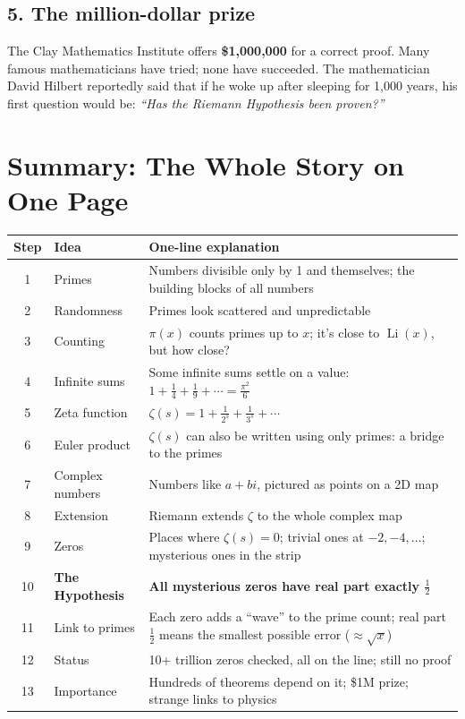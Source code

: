 \documentclass[11pt,a4paper]{article}
\newcommand{\Li}{\operatorname{Li}}
\begin{document}
\subsection*{5. The million-dollar prize}
The Clay Mathematics Institute offers \textbf{\$1{,}000{,}000} for a correct proof. Many famous mathematicians have tried; none have succeeded. The mathematician David Hilbert reportedly said that if he woke up after sleeping for 1,000 years, his first question would be: \emph{``Has the Riemann Hypothesis been proven?''}

\section{Summary: The Whole Story on One Page}

\begin{center}
\renewcommand{\arraystretch}{1.25}
\begin{tabularx}{\textwidth}{c l X}
\toprule
Step & Idea & One-line explanation \\
\midrule
1 & Primes & Numbers divisible only by 1 and themselves; the building blocks of all numbers \\
2 & Randomness & Primes look scattered and unpredictable \\
3 & Counting & $\pi(x)$ counts primes up to $x$; it's close to $\Li(x)$, but how close? \\
4 & Infinite sums & Some infinite sums settle on a value: $1 + \frac14 + \frac19 + \cdots = \frac{\pi^2}{6}$ \\
5 & Zeta function & $\zeta(s) = 1 + \frac1{2^s} + \frac1{3^s} + \cdots$ \\
6 & Euler product & $\zeta(s)$ can also be written using only primes: a bridge to the primes \\
7 & Complex numbers & Numbers like $a + bi$, pictured as points on a 2D map \\
8 & Extension & Riemann extends $\zeta$ to the whole complex map \\
9 & Zeros & Places where $\zeta(s) = 0$; trivial ones at $-2, -4, \ldots$; mysterious ones in the strip \\
10 & \textbf{The Hypothesis} & \textbf{All mysterious zeros have real part exactly $\tfrac12$} \\
11 & Link to primes & Each zero adds a ``wave'' to the prime count; real part $\frac12$ means the smallest possible error ($\approx\sqrt{x}$) \\
12 & Status & 10+ trillion zeros checked, all on the line; still no proof \\
13 & Importance & Hundreds of theorems depend on it; \$1M prize; strange links to physics \\
\bottomrule
\end{tabularx}
\end{center}
\end{document}
